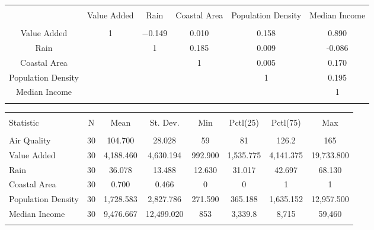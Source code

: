 \documentclass[
]{article}
\begin{document}
\begin{table}[!htbp] 
\small
\begin{minipage}[t]{.5\textwidth}
\begin{tabular}{@{\extracolsep{5pt}} cccccc} 
\\[-1.8ex]\hline 
\hline \\[-1.8ex] 
 & Value Added & Rain & Coastal Area & Population Density & Median Income \\ 
\hline \\[-1.8ex] 
Value Added & 1 & $-$0.149 & 0.010 & 0.158 & 0.890 \\ 
Rain &  & 1 & 0.185 & 0.009 & -0.086 \\ 
Coastal Area & &  & 1 & 0.005 & 0.170 \\ 
Population Density &  &  &  & 1 & 0.195 \\ 
Median Income &  &  &  &  & 1 \\ 
\hline \\[-1.8ex] 

\end{tabular} 
\end{minipage}

\begin{minipage}[t]{.5\textwidth}
\begin{tabular}{@{\extracolsep{5pt}}lccccccc} 
\\[-1.8ex]\hline 
\hline \\[-1.8ex] 
Statistic & \multicolumn{1}{c}{N} & \multicolumn{1}{c}{Mean} & \multicolumn{1}{c}{St. Dev.} & \multicolumn{1}{c}{Min} & \multicolumn{1}{c}{Pctl(25)} & \multicolumn{1}{c}{Pctl(75)} & \multicolumn{1}{c}{Max} \\ 
\hline \\[-1.8ex] 
Air Quality & 30 & 104.700 & 28.028 & 59 & 81 & 126.2 & 165 \\ 
Value Added & 30 & 4,188.460 & 4,630.194 & 992.900 & 1,535.775 & 4,141.375 & 19,733.800 \\ 
Rain & 30 & 36.078 & 13.488 & 12.630 & 31.017 & 42.697 & 68.130 \\ 
Coastal Area & 30 & 0.700 & 0.466 & 0 & 0 & 1 & 1 \\ 
Population Density & 30 & 1,728.583 & 2,827.786 & 271.590 & 365.188 & 1,635.152 & 12,957.500 \\ 
Median Income & 30 & 9,476.667 & 12,499.020 & 853 & 3,339.8 & 8,715 & 59,460 \\ 
\hline \\[-1.8ex] 
\end{tabular} 
\end{minipage}
\end{table}
\end{document}
